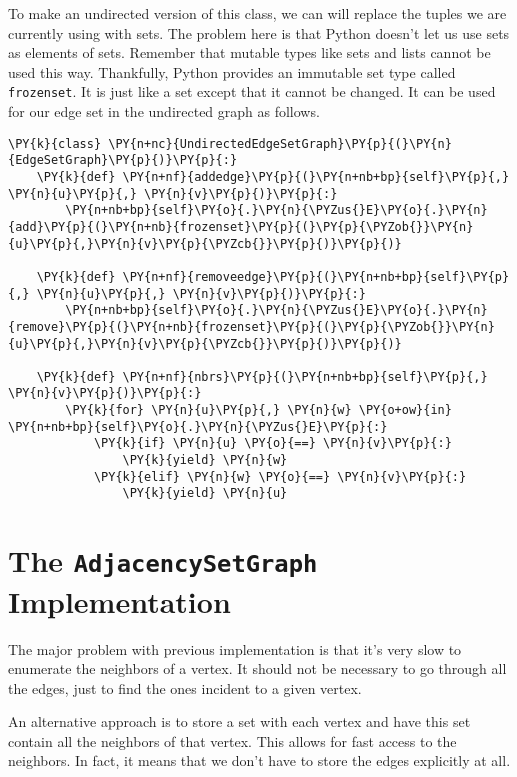 


To make an undirected version of this class, we can will replace the tuples we are currently using with sets.
The problem here is that Python doesn't let us use sets as elements of sets.
Remember that mutable types like sets and lists cannot be used this way.
Thankfully, Python provides an immutable set type called \texttt{frozenset}.
It is just like a set except that it cannot be changed.
It can be used for our edge set in the undirected graph as follows.

\begin{Verbatim}[commandchars=\\\{\}]
\PY{k}{class} \PY{n+nc}{UndirectedEdgeSetGraph}\PY{p}{(}\PY{n}{EdgeSetGraph}\PY{p}{)}\PY{p}{:}
    \PY{k}{def} \PY{n+nf}{addedge}\PY{p}{(}\PY{n+nb+bp}{self}\PY{p}{,} \PY{n}{u}\PY{p}{,} \PY{n}{v}\PY{p}{)}\PY{p}{:}
        \PY{n+nb+bp}{self}\PY{o}{.}\PY{n}{\PYZus{}E}\PY{o}{.}\PY{n}{add}\PY{p}{(}\PY{n+nb}{frozenset}\PY{p}{(}\PY{p}{\PYZob{}}\PY{n}{u}\PY{p}{,}\PY{n}{v}\PY{p}{\PYZcb{}}\PY{p}{)}\PY{p}{)}

    \PY{k}{def} \PY{n+nf}{removeedge}\PY{p}{(}\PY{n+nb+bp}{self}\PY{p}{,} \PY{n}{u}\PY{p}{,} \PY{n}{v}\PY{p}{)}\PY{p}{:}
        \PY{n+nb+bp}{self}\PY{o}{.}\PY{n}{\PYZus{}E}\PY{o}{.}\PY{n}{remove}\PY{p}{(}\PY{n+nb}{frozenset}\PY{p}{(}\PY{p}{\PYZob{}}\PY{n}{u}\PY{p}{,}\PY{n}{v}\PY{p}{\PYZcb{}}\PY{p}{)}\PY{p}{)}

    \PY{k}{def} \PY{n+nf}{nbrs}\PY{p}{(}\PY{n+nb+bp}{self}\PY{p}{,} \PY{n}{v}\PY{p}{)}\PY{p}{:}
        \PY{k}{for} \PY{n}{u}\PY{p}{,} \PY{n}{w} \PY{o+ow}{in} \PY{n+nb+bp}{self}\PY{o}{.}\PY{n}{\PYZus{}E}\PY{p}{:}
            \PY{k}{if} \PY{n}{u} \PY{o}{==} \PY{n}{v}\PY{p}{:}
                \PY{k}{yield} \PY{n}{w}
            \PY{k}{elif} \PY{n}{w} \PY{o}{==} \PY{n}{v}\PY{p}{:}
                \PY{k}{yield} \PY{n}{u}
\end{Verbatim}


\section{The \texttt{AdjacencySetGraph} Implementation}


The major problem with previous implementation is that it's very slow to enumerate the neighbors of a vertex.
It should not be necessary to go through all the edges, just to find the ones incident to a given vertex.


An alternative approach is to store a set with each vertex and have this set contain all the neighbors of that vertex.  This allows for fast access to the neighbors.  In fact, it means that we don't have to store the edges explicitly at all.

